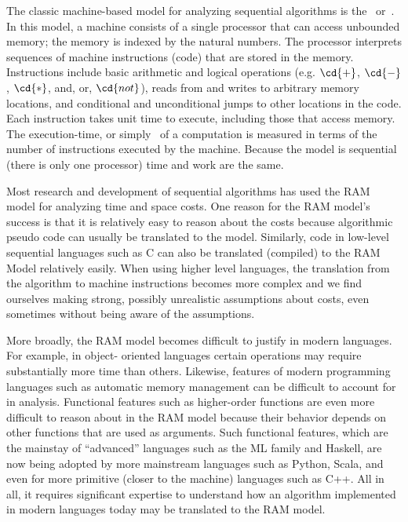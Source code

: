 \begin{gram}
%
The classic machine-based model for analyzing sequential algorithms is
the~ or~.
%
%
In this model, a machine consists of a single processor that can
access unbounded memory; the memory is indexed by the natural numbers.
%
The processor interprets sequences of machine instructions (code) that
are stored in the memory.  Instructions include basic arithmetic and
logical operations (e.g. $\cd{+}$, $\cd{-}$, $\cd{*}$, and, or,
$\cd{not}$), reads from and writes to arbitrary memory locations, and
conditional and unconditional jumps to other locations in the code.
%
Each instruction takes unit time to execute, including those that
access memory.
%
The execution-time, or simply~ of a computation is measured
in terms of the number of instructions executed by the machine.
%
Because the model is sequential (there is only one processor) time
and work are the same.
\end{gram}

\begin{gram}
Most research and development of sequential algorithms has used the RAM model for
analyzing time and space costs.
%
%
One reason for the RAM model's success is that it is relatively easy
to reason about the costs because algorithmic pseudo code can usually
be translated to the model.
%
Similarly, code in low-level sequential languages such as C can also
be translated (compiled) to the RAM Model relatively easily.
%
When using higher level languages, the translation from the algorithm to
machine instructions becomes more complex and we find ourselves making
strong, possibly unrealistic assumptions about costs, even sometimes
without being aware of the assumptions.  
%
%

%
More broadly, the RAM model becomes difficult to justify in modern
languages.
%
For example, in object- oriented languages certain operations may
require substantially more time than others.
%
Likewise, features of modern programming languages such as automatic
memory management can be difficult to account for in
analysis.
%
Functional features such as higher-order functions are even more
difficult to reason about in the RAM model because their behavior
depends on other functions that are used as arguments.
%
Such functional features, which are the mainstay of ``advanced''
languages such as the ML family and Haskell, are now being adopted by
more mainstream languages such as Python, Scala, and even for more primitive (closer to the machine)
languages such as C++.
%
All in all, it requires significant expertise to understand how an
algorithm implemented in modern languages today may be translated to the
RAM model.
%
\end{gram}


